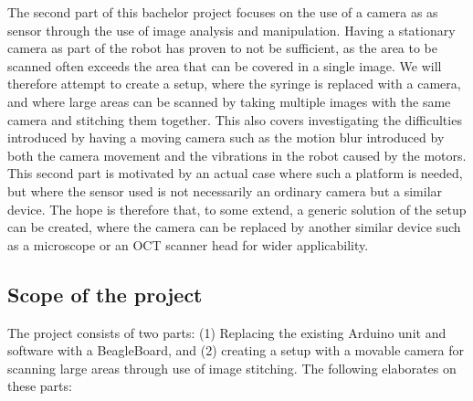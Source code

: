 \documentclass[a4paper,11pt]{article}
\begin{document}
The second part of this bachelor project focuses on the use of a camera
as as sensor through the use of image analysis and manipulation. Having
a stationary camera as part of the robot has proven to not be
sufficient, as the area to be scanned often exceeds the area that can be
covered in a single image. We will therefore attempt to create a setup,
where the syringe is replaced with a camera, and where large areas can
be scanned by taking multiple images with the same camera and stitching
them together. This also covers investigating the difficulties
introduced by having a moving camera such as the motion blur introduced
by both the camera movement and the vibrations in the robot caused by
the motors. This second part is motivated by an actual case where such a
platform is needed, but where the sensor used is not necessarily an ordinary
camera but a similar device. The hope is therefore that, to some extend, a
generic solution of the setup can be created, where the camera can be replaced
by another similar device such as a microscope or an OCT scanner head for wider
applicability.

\subsection{Scope of the project}
The project consists of two parts: (1) Replacing the existing Arduino
unit and software with a BeagleBoard, and (2) creating a setup with a
movable camera for scanning large areas through use of image stitching.
The following elaborates on these parts:
\end{document}
